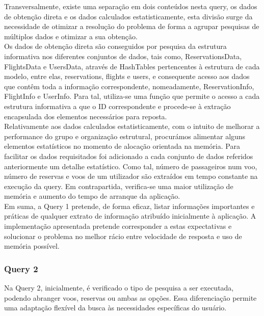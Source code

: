 \documentclass[12pt,a4paper]{article}
\begin{document}
    Transversalmente, existe uma separação em dois conteúdos nesta query, os dados de obtenção direta e os dados calculados estatisticamente, esta divisão surge da necessidade de otimizar a resolução do problema de forma a agrupar pesquisas de múltiplos dados e otimizar a sua obtenção.\\

    Os dados de obtenção direta são conseguidos por pesquisa da estrutura informativa nos diferentes conjuntos de dados, tais como, ReservationsData, FlightsData e UsersData, através de HashTables pertencentes à estrutura de cada modelo, entre elas, reservations, flights e users, e consequente acesso aos dados que contêm toda a informação correspondente, nomeadamente, ReservationInfo, FlightInfo e UserInfo. Para tal, utiliza-se uma função que permite o acesso a cada estrutura informativa a que o ID correspondente e procede-se à extração encapsulada dos elementos necessários para reposta.\\

    Relativamente aos dados calculados estatisticamente, com o intuito de melhorar a performance do grupo e organização estrutural, procurámos alimentar alguns elementos estatísticos no momento de alocação orientada na memória. Para facilitar os dados requisitados foi adicionado a cada conjunto de dados referidos anteriormente um detalhe estatístico. Como tal, número de passageiros num voo, número de reservas e voos de um utilizador são extraídos em tempo constante na execução da query. Em contrapartida, verifica-se uma maior utilização de memória e aumento do tempo de arranque da aplicação.\\

    Em suma, a Query 1 pretende, de forma eficaz, listar informações importantes e práticas de qualquer extrato de informação atribuído inicialmente à aplicação. A implementação apresentada pretende corresponder a estas expectativas e solucionar o problema no melhor rácio entre velocidade de resposta e uso de memória possível.
    
    \subsubsection{Query 2}
    \hspace{0,6cm}Na Query 2, inicialmente, é verificado o tipo de pesquisa a ser executada, podendo abranger voos, reservas ou ambas as opções. Essa diferenciação permite uma adaptação flexível da busca às necessidades específicas do usuário.\\
    
\end{document}
